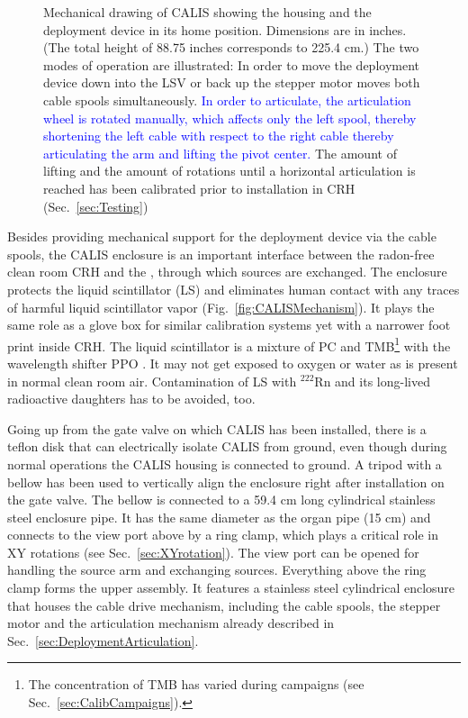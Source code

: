 \begin{figure}[htbp]
 \caption{Mechanical drawing of CALIS showing the housing and the deployment device in its home position. Dimensions are in inches. (The total height of 88.75 inches corresponds to 225.4 cm.) The two modes of operation are illustrated: In order to move the deployment device down into the LSV or back up the stepper motor moves both cable spools simultaneously. \textcolor{blue}{In order to articulate, the articulation wheel is rotated manually, which affects only the left spool, thereby shortening the left cable with respect to the right cable thereby articulating the arm and lifting the pivot center.} The amount of lifting and the amount of rotations until a horizontal articulation is reached has been calibrated prior to installation in CRH (Sec.~\ref{sec:Testing})\label{fig:CALISDimensions}\label{fig:CALISMechanism}\label{fig:gearDrawing}\label{fig:flushing_purging}
}
\end{figure}

Besides providing mechanical support for the deployment device via the cable spools, the CALIS enclosure is an important interface between the radon-free clean room CRH and the \lsv, through which sources are exchanged. 
The enclosure protects the liquid scintillator (LS) and eliminates human contact with any traces of harmful  liquid scintillator vapor (Fig.~\ref{fig:CALISMechanism}). It plays the same role as a glove box for similar calibration systems yet with a narrower foot print inside CRH. The liquid scintillator is a mixture of PC and TMB\footnote{The concentration of TMB has varied during campaigns (see Sec.~\ref{sec:CalibCampaigns}).} with the wavelength shifter PPO \cite{Agnes:2015qyz}. %
It may not get exposed to oxygen or water as is present in normal clean room air. Contamination of LS with $^{222}$Rn and its long-lived radioactive daughters has to be avoided, too. 

Going up from the gate valve on which CALIS has been installed, there is a teflon disk that can electrically isolate CALIS from ground, even though during normal operations the CALIS housing is connected to ground. A tripod with a bellow has been used to vertically align the enclosure right after installation on the gate valve. The bellow is connected to a 59.4 cm long cylindrical stainless steel enclosure pipe. It has the same diameter as the organ pipe (15 cm) and connects to the view port above by a ring clamp, which plays a critical role in XY rotations (see Sec.~\ref{sec:XYrotation}). The view port can be opened for handling the source arm and exchanging sources. Everything above the ring clamp forms the upper assembly. It features a stainless steel cylindrical enclosure that houses the cable drive mechanism, including the cable spools, the stepper motor and the articulation mechanism already described in Sec.~\ref{sec:DeploymentArticulation}. 

